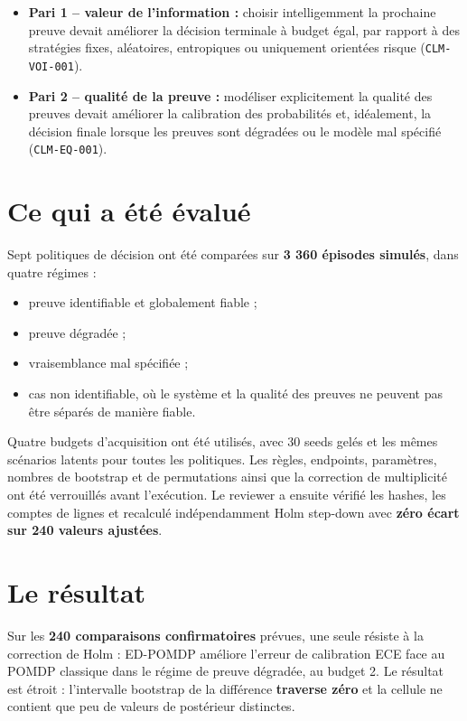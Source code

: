 \documentclass[11pt,a4paper]{article}
\newcommand{\claimvoi}{\texttt{CLM-VOI-001}}
\newcommand{\claimeq}{\texttt{CLM-EQ-001}}
\begin{document}
\begin{itemize}
  \item \textbf{Pari 1 -- valeur de l'information :} choisir intelligemment la prochaine preuve devait améliorer la décision terminale à budget égal, par rapport à des stratégies fixes, aléatoires, entropiques ou uniquement orientées risque (\claimvoi).
  \item \textbf{Pari 2 -- qualité de la preuve :} modéliser explicitement la qualité des preuves devait améliorer la calibration des probabilités et, idéalement, la décision finale lorsque les preuves sont dégradées ou le modèle mal spécifié (\claimeq).
\end{itemize}

\section*{Ce qui a été évalué}

Sept politiques de décision ont été comparées sur \textbf{3 360 épisodes simulés}, dans quatre régimes :

\begin{itemize}
  \item preuve identifiable et globalement fiable ;
  \item preuve dégradée ;
  \item vraisemblance mal spécifiée ;
  \item cas non identifiable, où le système et la qualité des preuves ne peuvent pas être séparés de manière fiable.
\end{itemize}

Quatre budgets d'acquisition ont été utilisés, avec 30 seeds gelés et les mêmes scénarios latents pour toutes les politiques. Les règles, endpoints, paramètres, nombres de bootstrap et de permutations ainsi que la correction de multiplicité ont été verrouillés avant l'exécution. Le reviewer a ensuite vérifié les hashes, les comptes de lignes et recalculé indépendamment Holm step-down avec \textbf{zéro écart sur 240 valeurs ajustées}.

\section*{Le résultat}

Sur les \textbf{240 comparaisons confirmatoires} prévues, une seule résiste à la correction de Holm : ED-POMDP améliore l'erreur de calibration ECE face au POMDP classique dans le régime de preuve dégradée, au budget 2. Le résultat est étroit : l'intervalle bootstrap de la différence \textbf{traverse zéro} et la cellule ne contient que peu de valeurs de postérieur distinctes.
\end{document}
